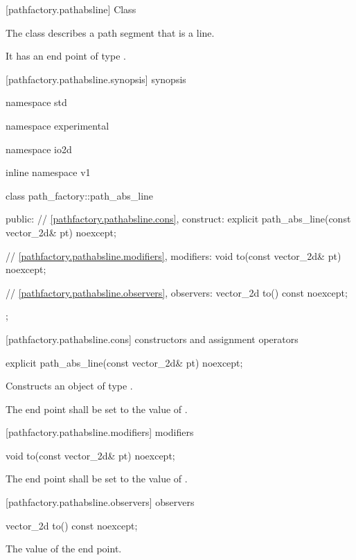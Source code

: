  [pathfactory.pathabsline] {Class }

\pnum
{}
The class  describes a path segment that is a line.

\pnum
It has an end point of type .

 [pathfactory.pathabsline.synopsis] { synopsis}

\begin{codeblock}
namespace std { namespace experimental { namespace io2d { inline namespace v1 {
  class path_factory::path_abs_line {
  public:
    // \ref{pathfactory.pathabsline.cons}, construct:
    explicit path_abs_line(const vector_2d& pt) noexcept;

    // \ref{pathfactory.pathabsline.modifiers}, modifiers:
    void to(const vector_2d& pt) noexcept;

    // \ref{pathfactory.pathabsline.observers}, observers:
    vector_2d to() const noexcept;
  };
} } } }
\end{codeblock}

 [pathfactory.pathabsline.cons] { constructors and assignment operators}

\begin{itemdecl}
    explicit path_abs_line(const vector_2d& pt) noexcept;
\end{itemdecl}
\begin{itemdescr}
	\pnum
	\effects
	Constructs an object of type .
	
	\pnum
	The end point shall be set to the value of .
\end{itemdescr}

 [pathfactory.pathabsline.modifiers]{ modifiers}

\begin{itemdecl}
    void to(const vector_2d& pt) noexcept;
\end{itemdecl}
\begin{itemdescr}
	\pnum
	\effects
	The end point shall be set to the value of .
\end{itemdescr}

 [pathfactory.pathabsline.observers]{ observers}

\begin{itemdecl}
    vector_2d to() const noexcept;
\end{itemdecl}
\begin{itemdescr}
	\pnum
	\returns
	The value of the end point.
\end{itemdescr}
